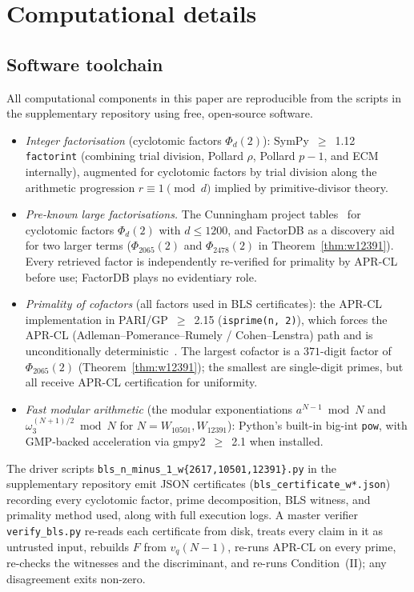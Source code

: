 \documentclass[11pt,a4paper]{amsart}
\theoremstyle{plain}
\theoremstyle{definition}
\newcommand{\wom}{\omega_3}
\begin{document}
\section{Computational details}
\label{sec:comp}

\subsection{Software toolchain}

All computational components in this paper are reproducible from the
scripts in the supplementary repository using free, open-source
software.

\begin{itemize}
\item \emph{Integer factorisation} (cyclotomic factors $\Phi_d(2)$):
  SymPy~$\geq$~1.12 \texttt{factorint} (combining trial division,
  Pollard $\rho$, Pollard $p-1$, and ECM internally), augmented for
  cyclotomic factors by trial division along the arithmetic
  progression $r \equiv 1 \pmod{d}$ implied by primitive-divisor
  theory.

\item \emph{Pre-known large factorisations.} The Cunningham project
  tables~\cite{Cunningham} for cyclotomic factors $\Phi_d(2)$ with
  $d \leq 1200$, and FactorDB as a discovery aid for two larger terms
  ($\Phi_{2065}(2)$ and $\Phi_{2478}(2)$ in Theorem~\ref{thm:w12391}).
  Every retrieved factor is independently re-verified for primality
  by APR-CL before use; FactorDB plays no evidentiary role.

\item \emph{Primality of cofactors} (all factors used in BLS
  certificates): the APR-CL implementation in PARI/GP~$\geq$~2.15
  (\texttt{isprime(n, 2)}), which forces the APR-CL
  (Adleman--Pomerance--Rumely / Cohen--Lenstra) path and is
  unconditionally deterministic~\cite{APR,CohenLenstra}. The largest
  cofactor is a $371$-digit factor of $\Phi_{2065}(2)$
  (Theorem~\ref{thm:w12391}); the smallest are single-digit primes,
  but all receive APR-CL certification for uniformity.

\item \emph{Fast modular arithmetic} (the modular exponentiations
  $a^{N-1} \bmod N$ and $\wom^{(N+1)/2} \bmod N$ for $N = W_{10501},
  W_{12391}$): Python's built-in big-int \texttt{pow}, with GMP-backed
  acceleration via gmpy2~$\geq$~2.1 when installed.
\end{itemize}

The driver scripts
\texttt{bls\_n\_minus\_1\_w\{2617,10501,12391\}.py} in the
supplementary repository emit JSON certificates
(\texttt{bls\_certificate\_w*.json}) recording every cyclotomic
factor, prime decomposition, BLS witness, and primality method used,
along with full execution logs. A master verifier
\texttt{verify\_bls.py} re-reads each certificate from disk, treats
every claim in it as untrusted input, rebuilds $F$ from $v_q(N-1)$,
re-runs APR-CL on every prime, re-checks the witnesses and the
discriminant, and re-runs Condition~(II); any disagreement exits
non-zero.
\end{document}
